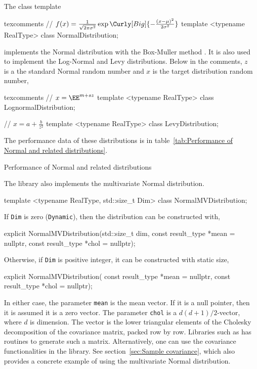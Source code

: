 The class template
\begin{cppcode*}{texcomments}
  // $f(x) = \frac{1}{\sqrt{2\pi\sigma^2}}\exp\Curly[Big]{-\frac{(x-\mu)^2}{2\sigma^2}}$
  template <typename RealType>
  class NormalDistribution;
\end{cppcode*}
implements the Normal distribution with the Box-Muller method
\parencite{Box:1958hv}. It is also used to implement the Log-Normal
and Levy distributions. Below in the comments, $z$ is a the standard Normal
random number and $x$ is the target distribution random number,
\begin{cppcode*}{texcomments}
  // $x = \EE^{m + s z}$
  template <typename RealType>
  class LognormalDistribution;

  // $x = a + \frac{b}{z^2}$
  template <typename RealType>
  class LevyDistribution;
\end{cppcode*}
The performance data of these distributions is in table~\ref{tab:Performance of
  Normal and related distributions}.

\begin{table}
  
  \caption{Performance of Normal and related distributions}
  \label{tab:Performance of Normal and related distributions}
\end{table}

The library also implements the multivariate Normal distribution.
\begin{cppcode}
  template <typename RealType, std::size_t Dim>
  class NormalMVDistribution;
\end{cppcode}
If \verb|Dim| is zero (\verb|Dynamic|), then the distribution can be
constructed with,
\begin{cppcode}
  explicit NormalMVDistribution(std::size_t dim,
      const result_type *mean = nullptr, const result_type *chol = nullptr);
\end{cppcode}
Otherwise, if \verb|Dim| is positive integer, it can be constructed with static
size,
\begin{cppcode}
  explicit NormalMVDistribution(
      const result_type *mean = nullptr, const result_type *chol = nullptr);
\end{cppcode}
In either case, the parameter \verb|mean| is the mean vector. If it is a null
pointer, then it is assumed it is a zero vector. The parameter \verb|chol| is a
$d(d + 1)/2$-vector, where $d$ is dimension. The vector is the lower triangular
elements of the Cholesky decomposition of the covariance matrix, packed row by
row. Libraries such as \lapack has routines to generate such a matrix.
Alternatively, one can use the covariance functionalities in the library. See
section~\ref{sec:Sample covariance}, which also provides a concrete example of
using the multivariate Normal distribution.

